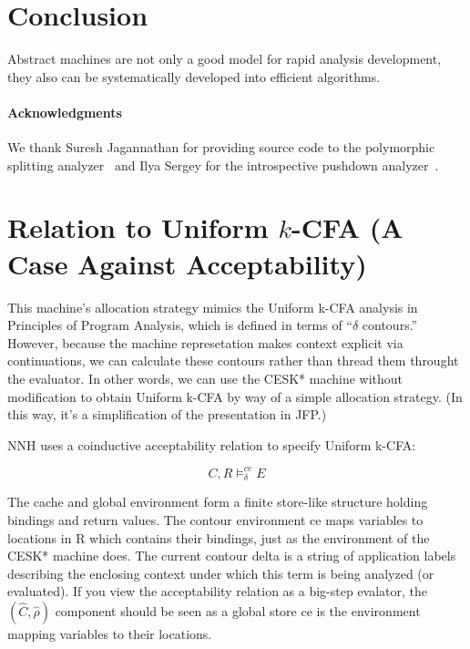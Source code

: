 \documentclass[preprint,onecolumn,9pt]{sigplanconf} %
\begin{document}
\section{Conclusion}
\label{sec:conclusion}

Abstract machines are not only a good model for rapid analysis
development, they also can be systematically developed into efficient
algorithms.



\paragraph{Acknowledgments}

We thank Suresh Jagannathan for providing source code to the
polymorphic splitting
analyzer~\cite{dvanhorn:wright-jagannathan-toplas98} and Ilya Sergey
for the introspective pushdown
analyzer~\cite{dvanhorn:Earl2012Introspective}.




\appendix
\section{Relation to Uniform \(k\)-CFA (A Case Against Acceptability)}
\label{sec:accept}

\cite{dvanhorn:nielson-nielson-popl97} \cite{dvanhorn:Neilson:1999}

This machine's allocation strategy mimics the Uniform k-CFA analysis
in Principles of Program Analysis, which is defined in terms of
``$\delta$ contours.''  However, because the machine represetation makes
context explicit via continuations, we can calculate these contours
rather than thread them throught the evaluator.  In other words, we
can use the CESK* machine without modification to obtain Uniform k-CFA
by way of a simple allocation strategy.  (In this way, it's a
simplification of the presentation in JFP.)

NNH uses a coinductive acceptability relation to specify Uniform
k-CFA:

\[
   C,R \models^{ce}_\delta E
\]

The cache and global environment form a finite store-like structure
holding bindings and return values.  The contour environment ce maps
variables to locations in R which contains their bindings, just as the
environment of the CESK* machine does.  The current contour delta is a
string of application labels describing the enclosing context under
which this term is being analyzed (or evaluated).  If you view the
acceptability relation as a big-step evalator, the
$(\widehat C,\widehat\rho)$ component should be seen as a global
store ce is the environment mapping variables to their locations.
\end{document}
